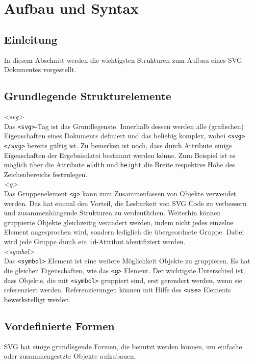 \section{Aufbau und Syntax}
\subsection{Einleitung}
In diesem Abschnitt werden die wichtigsten Strukturen zum Aufbau eines SVG Dokumentes vorgestellt.
\subsection{Grundlegende Strukturelemente}
\emph{<svg>}\\
 Das \texttt{<svg>}-Tag ist das Grundlegenste. Innerhalb dessen werden alle (grafischen) Eigenschaften eines Dokuments definiert und das beliebig komplex, wobei \texttt{<svg> </svg>} bereits gültig ist. Zu bemerken ist noch, dass durch Attribute einige Eigenschaften der Ergebnisdatei bestimmt werden könne. Zum Beispiel ist es möglich über die Attribute \texttt{width} und \texttt{height} die Breite respektive Höhe des Zeichenbereichs festzulegen.\\
 
\emph{<g>}\\
 Das Gruppenelement \texttt{<g>} kann zum Zusammenfassen von Objekte verwendet werden. Das hat einmal den Vorteil, die Lesbarkeit von SVG Code zu verbessern und zusammenhängende Strukturen zu verdeutlichen. Weiterhin können gruppierte Objekte gleichzeitig verändert werden, indem nicht jedes einzelne Element angesprochen wird, sondern lediglich die übergeordnete Gruppe. Dabei wird jede Gruppe durch ein \texttt{id}-Attribut identifiziert werden.\\
 
\emph{<symbol>}\\
 Das \texttt{<symbol>} Element ist eine weitere Möglichkeit Objekte zu gruppieren. Es hat die gleichen Eigenschaften, wie das \texttt{<g>} Element. Der wichtigste Unterschied ist, dass Objekte, die mit \texttt{<symbol>} gruppiert sind, erst gerendert werden, wenn sie referenziert werden. Referenzierungen können mit Hilfe des \texttt{<use>} Elements bewerkstelligt werden.
 
 \subsection{Vordefinierte Formen}
 SVG hat einige grundlegende Formen, die benutzt werden können, um einfache oder zusammengestzte Objekte aufzubauen.\\
 
